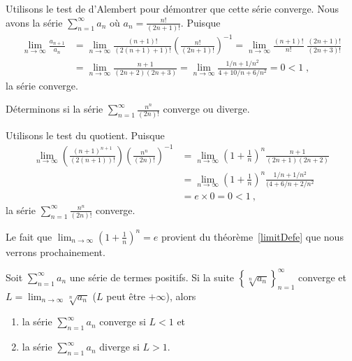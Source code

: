 {\begin{egg}
Utilisons le test de d'Alembert pour démontrer que cette
série converge.   Nous avons la série $\displaystyle \sum_{n=1}^\infty a_n$ où
$\displaystyle a_n = \frac{n!}{(2n+1)!}$.  Puisque
\begin{align*}
\lim_{n\rightarrow \infty} \frac{a_{n+1}}{a_n}
&= \lim_{n\rightarrow \infty} \frac{(n+1)!}{(2(n+1)+1)!}
\left(\frac{n!}{(2n+1)!}\right)^{-1}
= \lim_{n\rightarrow \infty}
\frac{(n+1)!}{n!}\;\frac{(2n+1)!}{(2n+3)!} \\
&= \lim_{n\rightarrow \infty} \frac{n+1}{(2n+2)(2n+3)}
= \lim_{n\rightarrow \infty} \frac{1/n + 1/n^2}{4 + 10/n + 6/n^2} = 0
<1 \; ,
\end{align*}
la série converge.
\end{egg}

\begin{egg}
Déterminons si la série
$\displaystyle \sum_{n=1}^\infty \frac{n^n}{(2n)!}$ converge ou diverge.

Utilisons le test du quotient.  Puisque
\begin{align*}
\lim_{n\to\infty} \left(\frac{(n+1)^{n+1}}{(2(n+1))!}\right)
\left(\frac{n^n}{(2n)!}\right)^{-1}
& = \lim_{n\to\infty} \left( 1 + \frac{1}{n}\right)^n
\frac{n+1}{(2n+1)(2n+2)}  \\
& = \lim_{n\to\infty} \left( 1 + \frac{1}{n}\right)^n
\frac{1/n + 1/n^2}{(4 + 6/n + 2/n^2}  \\
& = e \times 0 = 0 < 1 \ ,
\end{align*}
la série $\displaystyle \sum_{n=1}^\infty \frac{n^n}{(2n)!}$ converge.

Le fait que
$\displaystyle \lim_{n\to\infty} \left( 1 + \frac{1}{n}\right)^n = e$
provient du théorème~\ref{limitDefe} que nous verrons prochainement.
\end{egg}

\begin{theorem} \label{roottest}
Soit $\displaystyle \sum_{n=1}^\infty a_n$ une série de termes
positifs.  Si la suite
$\displaystyle \left\{ \sqrt[n]{a_n} \right\}_{n=1}^\infty$ converge
et $\displaystyle L = \lim_{n\rightarrow \infty} \sqrt[n]{a_n}$
($L$ peut être $+\infty$), alors
\begin{enumerate}
\item la série $\displaystyle \sum_{n=1}^\infty a_n$ converge si $L<1$ et
\item la série $\displaystyle \sum_{n=1}^\infty a_n$ diverge si $L>1$.
\end{enumerate}
\end{theorem}

}

